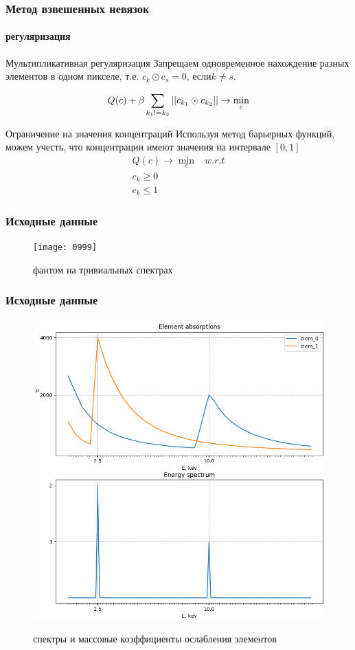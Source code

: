 \begin{frame}
\frametitle{Метод взвешенных невязок}
\framesubtitle{регуляризация}
  \begin{block}{Мультипликативная регуляризация}
    Запрещаем одновременное нахождение разных элементов в одном пикселе, т.е. $c_{k} \odot c_{s} = 0 \mbox{, если} k \neq s$.

    $$
    Q(c) + \beta\sum_{k_1 != k_2}\left|\left| c_{k_1} \odot c_{k_2} \right|\right| \to \min \limits_c
    $$
  \end{block}
  \begin{block}{Ограничение на значения концентраций}
  Используя метод барьерных функций, можем учесть, что концентрации имеют значения на интервале $[0, 1]$
    $$
    \begin{array}{lc}
    Q(c) \to \min \limits_c & w.r.t \\
    c_k \geq 0 & \\
    c_k \leq 1
    \end{array}
    $$
  \end{block}
\end{frame}

\begin{frame}
\frametitle{Исходные данные}
\begin{figure}
\centering
\texttt{[image: 0999]}
\\
\caption{фантом на тривиальных спектрах}
\end{figure}
\end{frame}


\begin{frame}
\frametitle{Исходные данные}
\begin{figure}

\centering
\includegraphics[height=0.7\textheight]{../Dissertation/images/part3_img/synth_spectre}
\\
\caption{спектры и массовые коэффициенты ослабления элементов}
\end{figure}

\end{frame}

